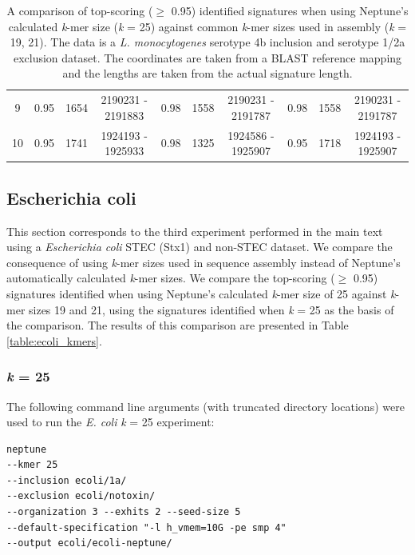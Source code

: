 \documentclass[a4paper,10pt]{article}
\begin{document}
\begin{landscape}
\begin{table}[!h]
\begin{tabular}{| c | c c c | c c c | c c c |}
  9 & 0.95 & 1654 & 2190231 - 2191883 & 0.98 & 1558 & 2190231 - 2191787 & 0.98 & 1558 & 2190231 - 2191787 \\ \cline{1-10}
  10 & 0.95 & 1741 & 1924193 - 1925933 & 0.98 & 1325 & 1924586 - 1925907 & 0.95 & 1718 & 1924193 - 1925907 \\
  \cline{1-10}
\end{tabular}%
\caption{A comparison of top-scoring (\(\geq\) 0.95) identified signatures when using Neptune's calculated \textit{k}-mer size (\textit{k} = 25) against common \textit{k}-mer sizes used in assembly (\textit{k} = 19, 21). The data is a \textit{L. monocytogenes} serotype 4b inclusion and serotype 1/2a exclusion dataset. The coordinates are taken from a BLAST reference mapping and the lengths are taken from the actual signature length.}
\label{table:4bv12a_kmers}
\end{table}
\vfill
\end{landscape}

\subsection{Escherichia coli}

This section corresponds to the third experiment performed in the main text using a \textit{Escherichia coli} STEC (Stx1) and non-STEC dataset. We compare the consequence of using \textit{k}-mer sizes used in sequence assembly instead of Neptune's automatically calculated \textit{k}-mer sizes. We compare the top-scoring (\(\geq\) 0.95) signatures identified when using Neptune's calculated \textit{k}-mer size of 25 against \textit{k}-mer sizes 19 and 21, using the signatures identified when \textit{k} = 25 as the basis of the comparison. The results of this comparison are presented in Table \ref{table:ecoli_kmers}.

\subsubsection*{\textit{k} = 25}

The following command line arguments (with truncated directory locations) were used to run the \textit{E. coli} \textit{k} = 25 experiment:

\begin{verbatim}
neptune
--kmer 25
--inclusion ecoli/1a/
--exclusion ecoli/notoxin/
--organization 3 --exhits 2 --seed-size 5
--default-specification "-l h_vmem=10G -pe smp 4"
--output ecoli/ecoli-neptune/
\end{verbatim}
\end{document}
